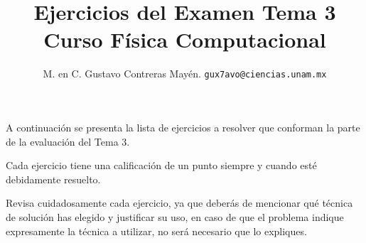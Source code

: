 \documentclass[letterpaper]{article}
\title{Ejercicios del Examen Tema 3 \\ {\large Curso Física Computacional}}
\author{M. en C. Gustavo Contreras Mayén. \texttt{gux7avo@ciencias.unam.mx}}
\date{ }
\begin{document}
\maketitle
\fontsize{14}{14}\selectfont

A continuación se presenta la lista de ejercicios a resolver que conforman la parte de la evaluación del Tema 3.
\par
Cada ejercicio tiene una calificación de un punto siempre y cuando esté debidamente resuelto.
\par
Revisa cuidadosamente cada ejercicio, ya que deberás de mencionar qué técnica de solución has elegido y justificar su uso, en caso de que el problema indique expresamente la técnica a utilizar, no será necesario que lo expliques.
\end{document}
